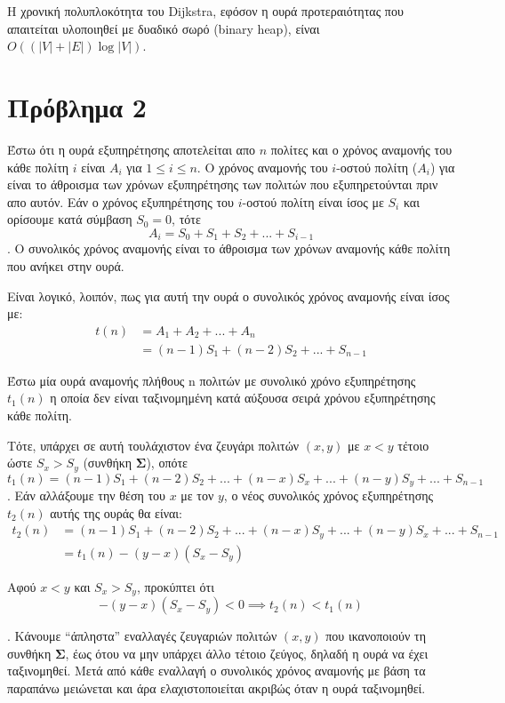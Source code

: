 \documentclass[12pt]{article}
\begin{document}
Η χρονική πολυπλοκότητα του Dijkstra, εφόσον η ουρά προτεραιότητας που απαιτείται υλοποιηθεί με δυαδικό σωρό (binary heap), είναι \(O((|V| + |E|)\log |V|)\). \hfill \blacksquare 

\newpage
\section*{Πρόβλημα 2 }
Έστω ότι η ουρά εξυπηρέτησης αποτελείται απο $n$ πολίτες και ο χρόνος αναμονής του κάθε πολίτη $i$ είναι $A_{i}$ για \(1 \leq i \leq n\).
Ο χρόνος αναμονής του $i$-οστού πολίτη ($A_{i}$) για  είναι το άθροισμα των χρόνων εξυπηρέτησης των πολιτών που εξυπηρετούνται πριν απο αυτόν. Εάν ο χρόνος εξυπηρέτησης του $i$-οστού πολίτη είναι ίσος με $S_{i}$ και ορίσουμε κατά σύμβαση $S_0 = 0$, τότε 
\[
A_{i} = S_{0} + S_{1} + S_{2} + ... + S_{i-1}
\]
. Ο συνολικός χρόνος αναμονής είναι το άθροισμα των χρόνων αναμονής κάθε πολίτη που ανήκει στην ουρά. 



Είναι λογικό, λοιπόν, πως για αυτή την ουρά ο συνολικός χρόνος αναμονής είναι ίσος με:
\begin{align*}
    t(n) &= A_{1} + A_{2} + ... + A_{n} \\
         &= (n-1)S_{1} + (n-2)S_{2} + ... + S_{n-1}
\end{align*}


Έστω μία ουρά αναμονής πλήθους n πολιτών με συνολικό χρόνο εξυπηρέτησης $t_{1}(n)$ η οποία δεν είναι ταξινομημένη κατά αύξουσα σειρά χρόνου εξυπηρέτησης κάθε πολίτη.

Τότε, υπάρχει σε αυτή τουλάχιστον ένα ζευγάρι πολιτών $(x,y)$ με $x < y$ τέτοιο ώστε $S_{x} > S_{y}$ (συνθήκη \textbf{Σ}), οπότε
\[
t_{1}(n) = (n-1)S_{1} + (n-2)S_{2} + ... + (n-x)S_{x} + ... +  (n-y)S_{y} + ... + S_{n-1}
\]
. Εάν αλλάξουμε την θέση του $x$ με τον $y$, ο νέος συνολικός χρόνος εξυπηρέτησης $t_2(n)$ αυτής της ουράς θα είναι:
\begin{align*}
    t_{2}(n) &= (n-1)S_{1} + (n-2)S_{2} + ... + (n-x)S_{y} + ... +  (n-y)S_{x} + ... + S_{n-1} \\
             &= t_{1}(n) - (y-x)(S_{x}-S_{y})
\end{align*}


Αφού $x < y$ και $S_{x} > S_{y}$, προκύπτει ότι 
$$- (y-x)(S_{x}-S_{y}) < 0 \implies t_{2}(n) < t_{1}(n)$$


. Κάνουμε ``άπληστα'' εναλλαγές ζευγαριών πολιτών $(x, y)$ που ικανοποιούν τη συνθήκη \textbf{Σ}, έως ότου να μην υπάρχει άλλο τέτοιο ζεύγος, δηλαδή η ουρά να έχει ταξινομηθεί. Μετά από κάθε εναλλαγή ο συνολικός χρόνος αναμονής με βάση τα παραπάνω μειώνεται και άρα ελαχιστοποιείται ακριβώς όταν η ουρά ταξινομηθεί. 
\end{document}
